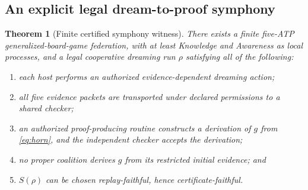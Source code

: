 \documentclass[11pt,letterpaper]{article}
\newtheorem{theorem}{Theorem}[section]
\theoremstyle{definition}
\theoremstyle{remark}
\begin{document}
\subsection{An explicit legal dream-to-proof symphony}
\begin{theorem}[Finite certified symphony witness]\label{thm:realize}
There exists a finite five-ATP generalized-board-game federation, with at least Knowledge and Awareness as local processes, and a legal cooperative dreaming run $\rho$ satisfying all of the following:
\begin{enumerate}[label=(\roman*)]
\item each host performs an authorized evidence-dependent dreaming action;
\item all five evidence packets are transported under declared permissions to a shared checker;
\item an authorized proof-producing routine constructs a derivation of $g$ from \eqref{eq:horn}, and the independent checker accepts the derivation;
\item no proper coalition derives $g$ from its restricted initial evidence; and
\item $S(\rho)$ can be chosen replay-faithful, hence certificate-faithful.
\end{enumerate}
\end{theorem}
\end{document}
